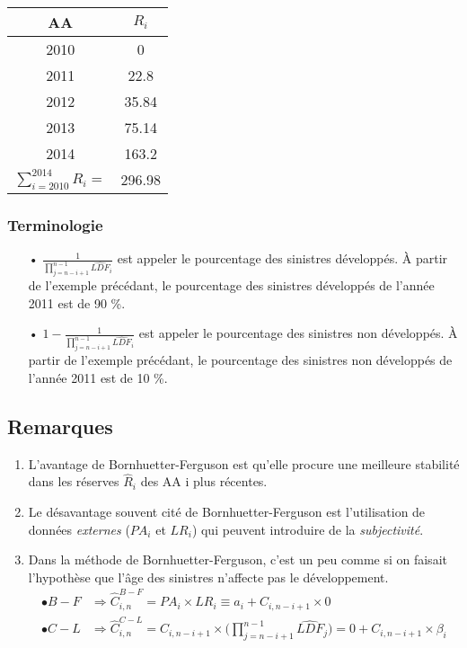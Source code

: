 \documentclass[11pt,french]{report}
\begin{document}
\begin{center}
\begin{tabular}{|c|c|}
  \hline
   AA & $R_i$  \\
  \hline
  2010 & 0 \\
  2011 & 22.8 \\
  2012 & 35.84 \\
  2013 & 75.14 \\
  2014 & 163.2 \\
  \hline
  \hline
  $\sum_{i = 2010}^{2014} R_i = $   & 296.98 \\
  \hline
\end{tabular}
\end{center}
\subsubsection*{Terminologie}
\begin{itemize}
\item[•] $\frac{1}{\prod_{j = n - i + 1}^{n - 1} \widehat{LDF}_i}$ est appeler le pourcentage des sinistres développés. 
À partir de l'exemple précédant, le pourcentage des sinistres développés de l'année 2011 est de 90 \%.
\item[•] $1 - \frac{1}{\prod_{j = n - i + 1}^{n - 1} \widehat{LDF}_i}$ est appeler le pourcentage des sinistres non développés. 
À partir de l'exemple précédant, le pourcentage des sinistres non développés de l'année 2011 est de 10 \%.
\end{itemize}

\subsection*{Remarques}
\begin{enumerate}
\item L'avantage de Bornhuetter-Ferguson est qu'elle procure une meilleure stabilité dans les réserves $\widehat{R}_i$ des AA i plus récentes.
\item Le désavantage souvent cité de Bornhuetter-Ferguson est l'utilisation de données \emph{externes} ($PA_i$ et $LR_i$) qui peuvent introduire de la \emph{subjectivité}.
\item Dans la méthode de Bornhuetter-Ferguson, c'est un peu comme si on faisait l'hypothèse que l'âge des sinistres n'affecte pas le développement.
\begin{align*}
\bullet B-F &\Rightarrow \widehat{C}_{i,n}^{B-F} = PA_i \times LR_i \equiv a_i + C_{i,n-i+1} \times 0 \\
\bullet C-L &\Rightarrow \widehat{C}_{i,n}^{C-L} = C_{i,n-i+1} \times \Big(\prod_{j=n-i+1}^{n-1} \widehat{LDF}_j \Big) = 0 + C_{i,n-i+1} \times \beta_i \\
\end{align*}
\end{enumerate}
\end{document}
